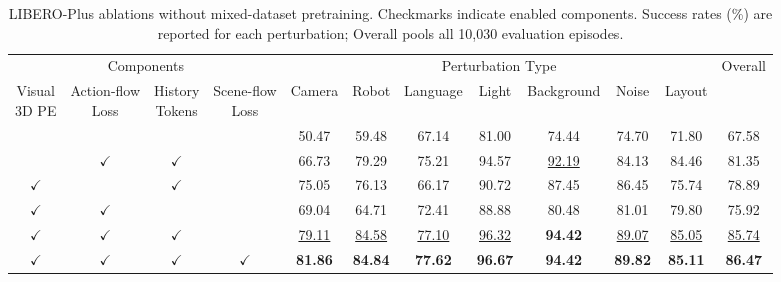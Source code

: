 \begin{table}[!b]
    \centering
    \small
    \setlength{\tabcolsep}{3pt}
    \renewcommand{\arraystretch}{0.96}
    \vspace{-0.85cm}

    \caption{LIBERO-Plus ablations without mixed-dataset pretraining.
    Checkmarks indicate enabled components.
    Success rates (\%) are reported for each perturbation;
    Overall pools all 10,030 evaluation episodes.}
    \label{tab:experiments:libero_plus_ablation}
    \begin{adjustbox}{max width=0.97\linewidth}
    \begin{tabular}{@{}cccc ccccccc c@{}}
        \toprule
        \multicolumn{4}{c}{Components}
        & \multicolumn{7}{c}{Perturbation Type}
        & Overall \\
        \cmidrule(lr){1-4}
        \cmidrule(lr){5-11}
        \shortstack{Visual\\3D PE}
        & \shortstack{Action-flow\\Loss}
        & \shortstack{History\\Tokens}
        & \shortstack{Scene-flow\\Loss}
        & Camera & Robot & Language & Light
        & Background & Noise & Layout & \\
        \midrule
        & & &
        & 50.47 & 59.48 & 67.14
        & 81.00 & 74.44 & 74.70
        & 71.80 & 67.58 \\

        & $\checkmark$ & $\checkmark$ &
        & 66.73 & 79.29 & 75.21
        & 94.57 & \underline{92.19} & 84.13
        & 84.46 & 81.35 \\

        $\checkmark$ & & $\checkmark$ &
        & 75.05 & 76.13 & 66.17
        & 90.72 & 87.45 & 86.45
        & 75.74 & 78.89 \\

        $\checkmark$ & $\checkmark$ & &
        & 69.04 & 64.71 & 72.41
        & 88.88 & 80.48 & 81.01
        & 79.80 & 75.92 \\

        $\checkmark$ & $\checkmark$ & $\checkmark$ &
        & \underline{79.11} & \underline{84.58} & \underline{77.10}
        & \underline{96.32} & \textbf{94.42} & \underline{89.07}
        & \underline{85.05} & \underline{85.74} \\

        $\checkmark$ & $\checkmark$ & $\checkmark$ & $\checkmark$
        & \textbf{81.86} & \textbf{84.84} & \textbf{77.62}
        & \textbf{96.67} & \textbf{94.42} & \textbf{89.82}
        & \textbf{85.11} & \textbf{86.47} \\
        \bottomrule
    \end{tabular}
    \end{adjustbox}
\end{table}


